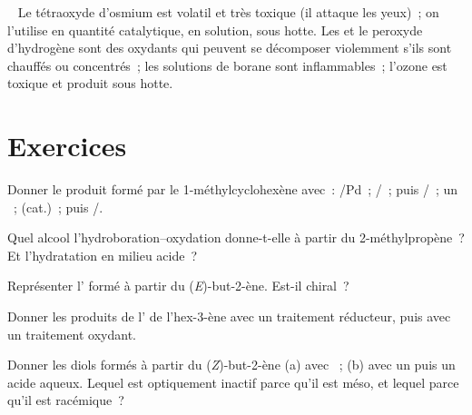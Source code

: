 \begin{safety}{\,\,\,}
Le tétraoxyde d'osmium est volatil et très toxique (il attaque les yeux)~; on l'utilise en
quantité catalytique, en solution, sous hotte. Les  et le peroxyde d'hydrogène sont
des oxydants qui peuvent se décomposer violemment s'ils sont chauffés ou concentrés~; les
solutions de borane sont inflammables~; l'ozone est toxique et produit sous hotte.
\end{safety}

\section{Exercices}

\begin{exercise}[$\star$]\label{exo:b2:alkene-redox:1}
Donner le produit formé par le 1-méthylcyclohexène avec~: /Pd~; /~;
 puis /~; un ~;  (cat.)~;  puis
/.
\end{exercise}

\begin{exercise}[$\star$]\label{exo:b2:alkene-redox:2}
Quel alcool l'hydroboration--oxydation donne-t-elle à partir du 2-méthylpropène~? Et
l'hydratation en milieu acide~?
\end{exercise}

\begin{exercise}[$\star$]\label{exo:b2:alkene-redox:3}
Représenter l' formé à partir du (\textit{E})-but-2-ène. Est-il chiral~?
\end{exercise}

\begin{exercise}[$\star$]\label{exo:b2:alkene-redox:4}
Donner les produits de l' de l'hex-3-ène avec un traitement réducteur, puis avec un
traitement oxydant.
\end{exercise}

\begin{exercise}[$\star\star$]\label{exo:b2:alkene-redox:5}
Donner les diols formés à partir du (\textit{Z})-but-2-ène (a) avec ~; (b) avec un
 puis un acide aqueux. Lequel est optiquement inactif parce qu'il est méso, et lequel
parce qu'il est racémique~?
\end{exercise}

